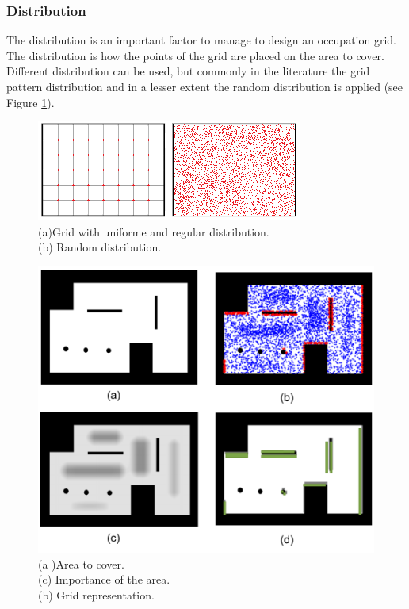 \subsubsection{ Distribution}
The distribution is an important factor to manage to design an occupation grid. The distribution is how the  points of the grid are placed on the area to cover.
Different distribution can be used, but commonly in the literature the grid pattern distribution and in a lesser extent the random distribution is applied (see Figure \ref{fig:GridVsRand}). \\
\begin{figure}[t!]
\begin{center}
   \includegraphics[width=\linewidth]{img/GridVsRand.png}
  \caption{ (a)Grid with uniforme and regular distribution.\\   
(b) Random distribution.\\  
}\label{fig:GridVsRand}
  \endminipage\hfill
  \end{center}
\end{figure}
\begin{figure}[t!]
\begin{center}
   \includegraphics[width=\linewidth]{img/randomGridRef171.png}
  \caption{ (a )Area  to cover.\\   
(c) Importance of the area.\\  
(b) Grid representation.}\label{fig:randomGridRef171}
  \endminipage\hfill
  \end{center}
\end{figure}


